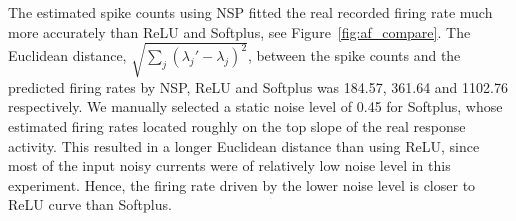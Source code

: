 \documentclass{article}
\begin{document}
	The estimated spike counts using NSP fitted the real recorded firing rate much more accurately than ReLU and Softplus, see Figure~\ref{fig:af_compare}.
	The Euclidean distance, $\sqrt{\sum_{j}(\lambda_j' - \lambda_j)^2}$, between the spike counts and the predicted firing rates by NSP, ReLU and Softplus was 184.57, 361.64 and 1102.76 respectively.
	We manually selected a static noise level of 0.45 for Softplus, whose estimated firing rates located roughly on the top slope of the real response activity.
	This resulted in a longer Euclidean distance than using ReLU, since most of the input noisy currents were of relatively low noise level in this experiment.
	Hence, the firing rate driven by the lower noise level is closer to ReLU curve than Softplus.
	
\end{document}

